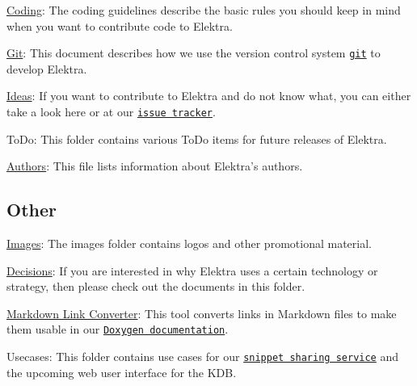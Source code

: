 \begin{DoxyItemize}
\item \hyperlink{doc_CODING_md}{Coding}\+: The coding guidelines describe the basic rules you should keep in mind when you want to contribute code to Elektra.
\item \hyperlink{doc_GIT_md}{Git}\+: This document describes how we use the version control system \href{https://git-scm.com}{\tt git} to develop Elektra.
\item \hyperlink{doc_IDEAS_md}{Ideas}\+: If you want to contribute to Elektra and do not know what, you can either take a look here or at our \href{http://libelektra.org/issues}{\tt issue tracker}.
\item To\+Do\+: This folder contains various To\+Do items for future releases of Elektra.
\item \hyperlink{doc_AUTHORS_md}{Authors}\+: This file lists information about Elektra’s authors.
\end{DoxyItemize}

\subsection*{Other}


\begin{DoxyItemize}
\item \hyperlink{doc_images_README_md}{Images}\+: The images folder contains logos and other promotional material.
\item \hyperlink{doc_decisions_README_md}{Decisions}\+: If you are interested in why Elektra uses a certain technology or strategy, then please check out the documents in this folder.
\item \hyperlink{doc_markdownlinkconverter_README_md}{Markdown Link Converter}\+: This tool converts links in Markdown files to make them usable in our \href{https://doc.libelektra.org/api/current/html}{\tt Doxygen documentation}.
\item Usecases\+: This folder contains use cases for our \href{https://www.libelektra.org/auth/login}{\tt snippet sharing service} and the upcoming web user interface for the K\+DB. 
\end{DoxyItemize}